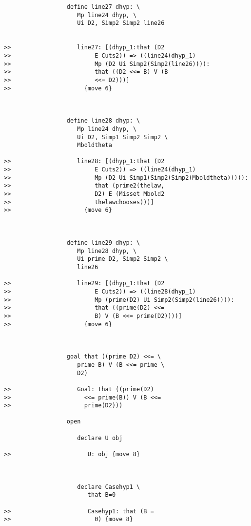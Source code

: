 \documentclass[12pt]{article}
\begin{document}
\begin{verbatim}
                  define line27 dhyp: \
                     Mp line24 dhyp, \
                     Ui D2, Simp2 Simp2 line26


>>                   line27: [(dhyp_1:that (D2
>>                        E Cuts2)) => ((line24(dhyp_1)
>>                        Mp (D2 Ui Simp2(Simp2(line26)))):
>>                        that ((D2 <<= B) V (B
>>                        <<= D2)))]
>>                     {move 6}



                  define line28 dhyp: \
                     Mp line24 dhyp, \
                     Ui D2, Simp1 Simp2 Simp2 \
                     Mboldtheta

>>                   line28: [(dhyp_1:that (D2
>>                        E Cuts2)) => ((line24(dhyp_1)
>>                        Mp (D2 Ui Simp1(Simp2(Simp2(Mboldtheta))))):
>>                        that (prime2(thelaw,
>>                        D2) E (Misset Mbold2
>>                        thelawchooses)))]
>>                     {move 6}



                  define line29 dhyp: \
                     Mp line28 dhyp, \
                     Ui prime D2, Simp2 Simp2 \
                     line26

>>                   line29: [(dhyp_1:that (D2
>>                        E Cuts2)) => ((line28(dhyp_1)
>>                        Mp (prime(D2) Ui Simp2(Simp2(line26)))):
>>                        that ((prime(D2) <<=
>>                        B) V (B <<= prime(D2))))]
>>                     {move 6}



                  goal that ((prime D2) <<= \
                     prime B) V (B <<= prime \
                     D2)

>>                   Goal: that ((prime(D2)
>>                     <<= prime(B)) V (B <<=
>>                     prime(D2)))

                  open

                     declare U obj

>>                      U: obj {move 8}



                     declare Casehyp1 \
                        that B=0

>>                      Casehyp1: that (B =
>>                        0) {move 8}




\end{verbatim}
\end{document}
